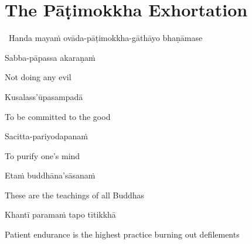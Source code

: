 \suttaRef{[Dhp 188-192]}




\section{The Pāṭimokkha Exhortation}
\label{patimokkha-exhortation}

\begin{leader}
  \anglebracketleft\ \hspace{-0.5mm}Handa mayaṁ ovāda-pāṭimokkha-gāthāyo bhaṇāmase \hspace{-0.5mm}\anglebracketright\
\end{leader}

Sabba-pāpassa akaraṇaṁ\makeatletter\hyperlink{endnote33-appendix}\makeatother

\begin{english}
  Not doing any evil
\end{english}

Kusalass'ūpasampadā

\begin{english}
  To be committed to the good
\end{english}

Sacitta-pariyodapanaṁ

\begin{english}
  To purify one's mind
\end{english}

Etaṁ buddhāna'sāsanaṁ

\begin{english}
  These are the teachings of all Buddhas
\end{english}

Khantī paramaṁ tapo tītikkhā

\begin{english}
  Patient endurance is the highest practice burning out defilements
\end{english}

